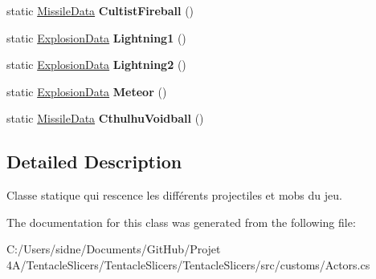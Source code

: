 \begin{DoxyCompactItemize}
\mbox{\label{class_tentacle_slicers_1_1customs_1_1_actors_a77361e988596ff219d01ad19853f84e9}} 
static \hyperlink{class_tentacle_slicers_1_1actors_1_1_missile_data}{Missile\+Data} {\bfseries Cultist\+Fireball} ()
\item 
\mbox{\label{class_tentacle_slicers_1_1customs_1_1_actors_ae5d23a4afd230e3d09e20c923241ba54}} 
static \hyperlink{class_tentacle_slicers_1_1actors_1_1_explosion_data}{Explosion\+Data} {\bfseries Lightning1} ()
\item 
\mbox{\label{class_tentacle_slicers_1_1customs_1_1_actors_a54ef23a93e9162b7e2865c36ce36c468}} 
static \hyperlink{class_tentacle_slicers_1_1actors_1_1_explosion_data}{Explosion\+Data} {\bfseries Lightning2} ()
\item 
\mbox{\label{class_tentacle_slicers_1_1customs_1_1_actors_a0849c0dd9b9de171db2ad65e55538d51}} 
static \hyperlink{class_tentacle_slicers_1_1actors_1_1_explosion_data}{Explosion\+Data} {\bfseries Meteor} ()
\item 
\mbox{\label{class_tentacle_slicers_1_1customs_1_1_actors_ab88acaae96f000167ea749924a9cbb62}} 
static \hyperlink{class_tentacle_slicers_1_1actors_1_1_missile_data}{Missile\+Data} {\bfseries Cthulhu\+Voidball} ()
\end{DoxyCompactItemize}


\subsection{Detailed Description}
Classe statique qui rescence les différents projectiles et mobs du jeu. 



The documentation for this class was generated from the following file\+:\begin{DoxyCompactItemize}
\item 
C\+:/\+Users/sidne/\+Documents/\+Git\+Hub/\+Projet 4\+A/\+Tentacle\+Slicers/\+Tentacle\+Slicers/\+Tentacle\+Slicers/src/customs/Actors.\+cs\end{DoxyCompactItemize}
